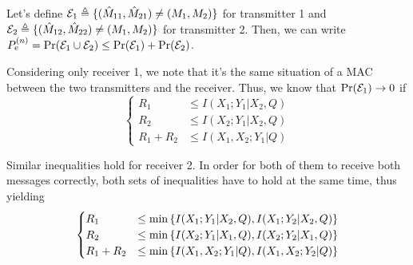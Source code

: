 
Let's define $\mathcal{E}_1 \triangleq \{ (\hat{M}_{11},\hat{M}_{21}) \neq (M_1,M_2) \}$ for transmitter 1 and $\mathcal{E}_2 \triangleq \{ (\hat{M}_{12},\hat{M}_{22}) \neq (M_1,M_2) \}$ for transmitter 2. Then, we can write $ P_e^{(n)}  = \Pr(\mathcal{E}_1 \cup \mathcal{E}_2) \leq \Pr(\mathcal{E}_1) + \Pr(\mathcal{E}_2)$.

Considering only receiver 1, we note that it's the same situation of a MAC between the two transmitters and the receiver. Thus, we know that $\Pr(\mathcal{E}_1) \rightarrow 0$ if
%
\begin{equation}
\begin{cases}
	R_1 &\leq I(X_1;Y_1|X_2,Q)\\
	R_2 &\leq I(X_2;Y_1|X_2,Q)\\
	R_1+R_2 &\leq I(X_1,X_2;Y_1|Q)
\end{cases}
\end{equation}

Similar inequalities hold for receiver 2. In order for both of them to receive both messages correctly, both sets of inequalities have to hold at the same time, thus yielding
%
\begin{equation}
\begin{cases}
	R_1 &\leq \min \qty{ I(X_1;Y_1|X_2,Q),I(X_1;Y_2|X_2,Q) }\\
	R_2 &\leq \min \qty{ I(X_2;Y_1|X_1,Q),I(X_2;Y_2|X_1,Q) }\\
	R_1+R_2 &\leq \min \qty{ I(X_1,X_2;Y_1|Q),I(X_1,X_2;Y_2|Q) }
\end{cases}
\end{equation}